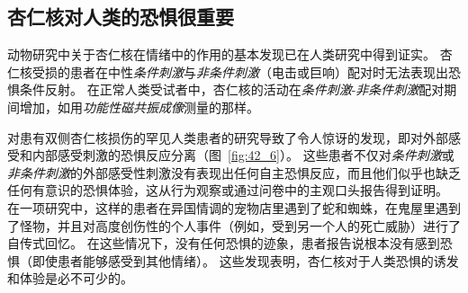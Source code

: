\subsection{杏仁核对人类的恐惧很重要}

动物研究中关于杏仁核在情绪中的作用的基本发现已在人类研究中得到证实。
杏仁核受损的患者在中性\textit{条件刺激}与\textit{非条件刺激}（电击或巨响）配对时无法表现出恐惧条件反射。
在正常人类受试者中，杏仁核的活动在\textit{条件刺激}-\textit{非条件刺激}配对期间增加，如用\textit{功能性磁共振成像}测量的那样。


对患有双侧杏仁核损伤的罕见人类患者的研究导致了令人惊讶的发现，即对外部感受和内部感受刺激的恐惧反应分离（图~\ref{fig:42_6}）。
这些患者不仅对\textit{条件刺激}或\textit{非条件刺激}的外部感受性刺激没有表现出任何自主恐惧反应，而且他们似乎也缺乏任何有意识的恐惧体验，这从行为观察或通过问卷中的主观口头报告得到证明。
在一项研究中，这样的患者在异国情调的宠物店里遇到了蛇和蜘蛛，在鬼屋里遇到了怪物，并且对高度创伤性的个人事件（例如，受到另一个人的死亡威胁）进行了自传式回忆。
在这些情况下，没有任何恐惧的迹象，患者报告说根本没有感到恐惧（即使患者能够感受到其他情绪）。
这些发现表明，杏仁核对于人类恐惧的诱发和体验是必不可少的。


